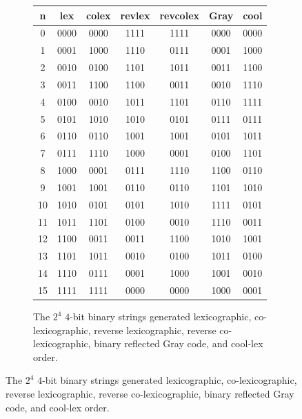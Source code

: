  \begin{figure}[]

     \begin{subfigure}[]{\textwidth}
         \begin{center}
             \begin{tabular}{ |c|c|c|c|c||c||c| } 
                 \hline
                 n &  lex  & colex & revlex & revcolex & Gray & cool\\  
                 \hline
                 0 & 0000 & 0000 & 1111 & 1111 & 0000   & 0000  \\
                 1 & 0001 & 1000 & 1110 & 0111 & 0001   & 1000  \\
                 2 & 0010 & 0100 & 1101 & 1011 & 0011   & 1100  \\
                 3 & 0011 & 1100 & 1100 & 0011 & 0010   & 1110  \\
                 4 & 0100 & 0010 & 1011 & 1101 & 0110   & 1111  \\
                 5 & 0101 & 1010 & 1010 & 0101 & 0111   & 0111  \\
                 6 & 0110 & 0110 & 1001 & 1001 & 0101   & 1011  \\
                 7 & 0111 & 1110 & 1000 & 0001 & 0100   & 1101  \\
                 8 & 1000 & 0001 & 0111 & 1110 & 1100   & 0110  \\
                 9 & 1001 & 1001 & 0110 & 0110 & 1101   & 1010  \\
                 10 & 1010 & 0101 & 0101 & 1010 & 1111  & 0101  \\
                 11 & 1011 & 1101 & 0100 & 0010 & 1110  & 0011  \\
                 12 & 1100 & 0011 & 0011 & 1100 & 1010  & 1001  \\
                 13 & 1101 & 1011 & 0010 & 0100 & 1011  & 0100  \\
                 14 & 1110 & 0111 & 0001 & 1000 & 1001  & 0010  \\
                 15 & 1111 & 1111 & 0000 & 0000 & 1000  & 0001  \\
                 \hline
             \end{tabular}
         \end{center}
         \caption{The $2^4$ $4$-bit binary strings generated lexicographic, co-lexicographic, reverse lexicographic, reverse co-lexicographic, binary reflected Gray code, and cool-lex order.}
         \label{fig:bin4}
     \end{subfigure}

\end{figure}

